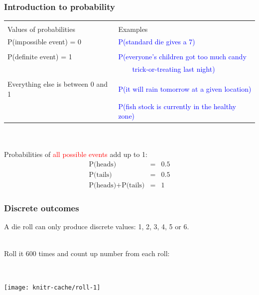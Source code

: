 
\begin{frame}
\frametitle{Introduction to probability}

\begin{tabular}{ll}
  & \\
Values of probabilities  & Examples \\
  \hline
P(impossible event) = 0 & \textcolor{blue}{P(standard die gives a 7)} \\
  & \\
P(definite event) = 1 & \textcolor{blue}{P(everyone's children got too much candy}\\
  &                     \textcolor{blue}{~~~~trick-or-treating last night)} \\
  & \\
Everything else is between 0 and 1 & \textcolor{blue}{P(it will rain tomorrow at a given location)}\\
                                   & \textcolor{blue}{P(fish stock is currently in the healthy zone)}
\end{tabular}

\pause

~\\

~\\

Probabilities of \textcolor{red}{all possible events} add up to 1:
\begin{eqnarray}
\nonumber \mbox{P(heads)} & = & 0.5\\
\nonumber \mbox{P(tails)} & = & 0.5\\
\nonumber \mbox{P(heads)} + \mbox{P(tails)} & = & 1
\end{eqnarray}
\end{frame}

\begin{frame}
\frametitle{Discrete outcomes}

A die roll can only produce \alert{discrete} values: 1, 2, 3, 4, 5 or 6.

~\\

Roll it 600 times and count up number from each roll:

~\\
\begin{knitrout}
\color{fgcolor}
\texttt{[image: knitr-cache/roll-1]}

\end{knitrout}

\end{frame}

